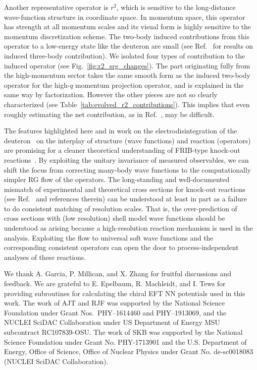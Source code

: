 \documentclass[10pt,aps,prc,floatfix,twocolumn,nofootinbib]{revtex4-1}
\begin{document}
Another representative operator is $r^2$, which is sensitive to the long-distance wave-function structure in coordinate space.
In momentum space, this operator has strength at all momentum scales and its visual form is highly sensitive to the momentum discretization scheme.
The two-body induced contributions from this operator to a low-energy state like the deuteron are small (see Ref.~\cite{Schuster:2014lga} for results on induced three-body contribution).
We isolated four types of contribution to the induced operator (see Fig.~\ref{fig:r2_srg_changes}).
The part originating fully from the high-momentum sector takes the same smooth form as the induced two-body operator for the high-$q$ momentum projection operator, and is explained in the same way by factorization.
However the other pieces are not so clearly characterized (see Table~\ref{tab:evolved_r2_contributions}).
This implies that even roughly estimating the net contribution, as in Ref.~\cite{Miller:2018mfb}, may be difficult.


The features highlighted here and in work on the electrodisintegration of the deuteron~\cite{More:2015tpa,More:2017syr} on the interplay of structure (wave functions) and reaction (operators) are promising for a cleaner theoretical understanding of FRIB-type knock-out reactions~\cite{Moro:2018mdk}.
By exploiting the unitary invariance of measured observables, we can shift the focus from correcting many-body wave functions to the computationally simpler RG flow of the operators. 
The long-standing and well-documented mismatch of experimental and theoretical cross sections for knock-out reactions (see Ref.~\cite{Tostevin:2014usa} and references therein) can be understood at least in part as a failure to do consistent matching of resolution scales.
That is, the over-prediction of cross sections with (low resolution) shell model wave functions should be understood as arising because a high-resolution reaction mechanism is used in the analysis. 
Exploiting the flow to universal soft wave functions and the corresponding consistent operators can open the door to process-independent analyses of these reactions.


\begin{acknowledgments}
We thank A. Garcia, P. Millican, and X. Zhang for fruitful discussions and feedback.
We are grateful to E. Epelbaum, R. Machleidt, and I. Tews for providing subroutines for calculating the chiral EFT NN potentials used in this work.
The work of AJT and RJF was supported by the National Science Foundation under Grant Nos.~PHY--1614460 and PHY--1913069, and the NUCLEI SciDAC Collaboration under US Department of Energy MSU subcontract RC107839-OSU\@.
The work of SKB was supported by the National Science Foundation under Grant No. PHY-1713901 and the U.S. Department of Energy, Office of Science, Office of Nuclear Physics under Grant No. de-sc0018083 (NUCLEI SciDAC Collaboration).
\end{acknowledgments}



\end{document}
